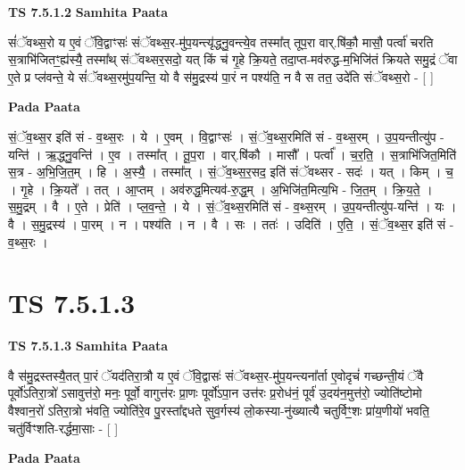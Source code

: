 \documentclass[17pt]{extarticle}
\begin{document}
\textbf{TS 7.5.1.2 } \newline
\textbf{Samhita Paata} \newline

सं॑ॅवथ्स॒रो य ए॒वं ॅवि॒द्वाꣳसः॑ संॅवथ्स॒र-मु॑प॒यन्त्यृ॑द्ध्नु॒वन्त्ये॒व तस्मा᳚त् तूप॒रा वार्.षि॑कौ॒ मासौ॒ पर्त्वा॑ चरति स॒त्राभि॑जितꣳ॒॒ह्य॑स्यै॒ तस्मा᳚थ् संॅवथ्सर॒सदो॒ यत् किं च॑ गृ॒हे क्रि॒यते॒ तदा॒प्त-मव॑रुद्ध-म॒भिजि॑तं क्रियते समु॒द्रं ॅवा ए॒ते प्र प्ल॑वन्ते॒ ये सं॑ॅवथ्स॒रमु॑प॒यन्ति॒ यो वै स॑मु॒द्रस्य॑ पा॒रं न पश्य॑ति॒ न वै स तत॒ उदे॑ति संॅवथ्स॒रो - [  ] \newline

\textbf{Pada Paata} \newline

सं॒ॅव॒थ्स॒र इति॑ सं - व॒थ्स॒रः । ये । ए॒वम् । वि॒द्वाꣳसः॑ । सं॒ॅव॒थ्स॒रमिति॑ सं - व॒थ्स॒रम् । उ॒प॒यन्तीत्यु॑प - यन्ति॑ । ऋ॒द्ध्नु॒वन्ति॑ । ए॒व । तस्मा᳚त् । तू॒प॒रा । वार्.षि॑कौ । मासौ᳚ । पर्त्वा᳚ । च॒र॒ति॒ । स॒त्राभि॑जित॒मिति॑ स॒त्र - अ॒भि॒जि॒त॒म् । हि । अ॒स्यै॒ । तस्मा᳚त् । सं॒ॅव॒थ्स॒र॒सद॒ इति॑ संॅवथ्सर - सदः॑ । यत् । किम् । च॒ । गृ॒हे । क्रि॒यते᳚ । तत् । आ॒प्तम् । अव॑रुद्ध॒मित्यव॑-रु॒द्ध॒म् । अ॒भिजि॑त॒मित्य॒भि - जि॒त॒म् । क्रि॒य॒ते॒ । स॒मु॒द्रम् । वै । ए॒ते । प्रेति॑ । प्ल॒व॒न्ते॒ । ये । सं॒ॅव॒थ्स॒रमिति॑ सं - व॒थ्स॒रम् । उ॒प॒यन्तीत्यु॑प-यन्ति॑ । यः । वै । स॒मु॒द्रस्य॑ । पा॒रम् । न । पश्य॑ति । न । वै । सः । ततः॑ । उदिति॑ । ए॒ति॒ । सं॒ॅव॒थ्स॒र इति॑ सं - व॒थ्स॒रः ।  \newline





\section{ TS 7.5.1.3 }

\textbf{TS 7.5.1.3 } \newline
\textbf{Samhita Paata} \newline

वै स॑मु॒द्रस्तस्यै॒तत् पा॒रं ॅयद॑तिरा॒त्रौ य ए॒वं ॅवि॒द्वासः॑ संॅवथ्स॒र-मु॑प॒यन्त्यना᳚र्ता ए॒वोदृचं॑ गच्छन्ती॒यं ॅवै पूर्वो॑ऽतिरा॒त्रो॑ ऽसावुत्त॑रो॒ मनः॒ पूर्वो॒ वागुत्त॑रः प्रा॒णः पूर्वो॑ऽपा॒न उत्त॑रः प्र॒रोध॑नं॒ पूर्व॑ उ॒दय॑न॒मुत्त॑रो॒ ज्योति॑ष्टोमो वैश्वान॒रो॑ ऽतिरा॒त्रो भ॑वति॒ ज्योति॑रे॒व पु॒रस्ता᳚द्दधते सुव॒र्गस्य॑ लो॒कस्या-नु॑ख्यात्यै चतुर्विꣳ॒॒शः प्रा॑य॒णीयो॑ भवति॒ चतु॑र्विꣳशति-रर्द्धमा॒साः - [  ] \newline

\textbf{Pada Paata} \newline
\end{document}
